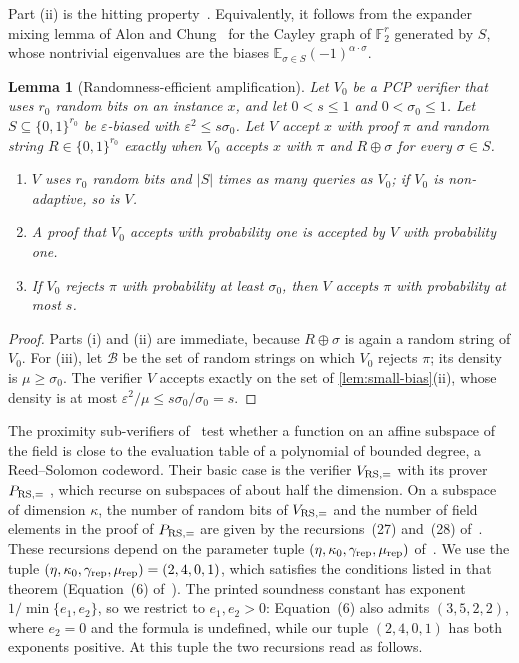 \documentclass[11pt,letterpaper]{article}
\newtheorem{lemma}[theorem]{Lemma}
\theoremstyle{definition}
\theoremstyle{remark}
\newcommand{\E}{\mathbb E}
\newcommand{\abs}[1]{\left|#1\right|}
\begin{document}
Part (ii) is the hitting property~\cite[Lemma~4.7]{BV14}. Equivalently,
it follows from the expander mixing lemma of Alon and
Chung~\cite{AC88} for the Cayley graph of \(\mathbb F_2^r\) generated by
\(S\), whose nontrivial eigenvalues are the biases
\(\E_{\sigma\in S}(-1)^{\alpha\cdot\sigma}\).

\begin{lemma}[Randomness-efficient amplification]\label{lem:patch-r}
Let \(V_0\) be a PCP verifier that uses \(r_0\) random bits on an
instance \(x\), and let \(0<s\le1\) and \(0<\sigma_0\le1\). Let
\(S\subseteq\{0,1\}^{r_0}\) be \(\varepsilon\)-biased with
\(\varepsilon^2\le s\sigma_0\). Let \(V\) accept \(x\) with proof \(\pi\)
and random string \(R\in\{0,1\}^{r_0}\) exactly when \(V_0\) accepts
\(x\) with \(\pi\) and \(R\oplus\sigma\) for every \(\sigma\in S\).
\begin{enumerate}[label=(\roman*)]
\item \(V\) uses \(r_0\) random bits and \(\abs S\) times as many queries
as \(V_0\); if \(V_0\) is non-adaptive, so is \(V\).
\item A proof that \(V_0\) accepts with probability one is accepted by
\(V\) with probability one.
\item If \(V_0\) rejects \(\pi\) with probability at least \(\sigma_0\),
then \(V\) accepts \(\pi\) with probability at most \(s\).
\end{enumerate}
\end{lemma}
\begin{proof}
Parts (i) and (ii) are immediate, because \(R\oplus\sigma\) is again a
random string of \(V_0\). For (iii), let \(\mathcal B\) be the set of
random strings on which \(V_0\) rejects \(\pi\); its density is
\(\mu\ge\sigma_0\). The verifier \(V\) accepts exactly on the set of
\cref{lem:small-bias}(ii), whose density is at most
\(\varepsilon^2/\mu\le s\sigma_0/\sigma_0=s\).
\end{proof}

The proximity sub-verifiers of~\cite{BCGT13} test whether a function on
an affine subspace of the field is close to the evaluation table of a
polynomial of bounded degree, a Reed--Solomon codeword. Their basic
case is the verifier \(V_{\rm RS,=}\) with its prover \(P_{\rm RS,=}\)
\cite[Algorithms~16 and~7]{BCGT13}, which recurse on subspaces of
about half the dimension. On a subspace of dimension \(\kappa\), the
number of random bits of \(V_{\rm RS,=}\) and the number of field
elements in the proof of \(P_{\rm RS,=}\) are given by the
recursions~(27) and~(28) of~\cite[Section~C.8]{BCGT13}. These
recursions depend on the parameter tuple
\((\eta,\kappa_0,\gamma_{\rm rep},\mu_{\rm rep})\)
of~\cite[Theorem~11.1]{BCGT13}. We use the tuple
\((\eta,\kappa_0,\gamma_{\rm rep},\mu_{\rm rep})=(2,4,0,1)\), which
satisfies the conditions listed in that theorem (Equation~(6)
of~\cite[Theorem~11.3]{BCGT13}).
The printed soundness constant has exponent \(1/\min\{e_1,e_2\}\), so
we restrict to \(e_1,e_2>0\): Equation~(6) also admits
\((3,5,2,2)\), where \(e_2=0\) and the formula is undefined, while
our tuple \((2,4,0,1)\) has both exponents positive.
At this tuple the two recursions read as follows.
\end{document}
